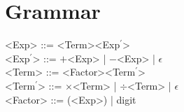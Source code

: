\documentclass[10pt,letterpaper]{article}
\begin{document}
\section{Grammar}

<Exp> ::= <Term><Exp$^{\prime}$>\\
<Exp$^{\prime}$> ::= $+$<Exp> | $-$<Exp> | $\epsilon$\\
<Term> ::= <Factor><Term$^{\prime}$>\\
<Term$^\prime$> ::= $\times$<Term> | $\div$<Term> | $\epsilon$\\
<Factor> ::= (<Exp>) | digit
\end{document}

